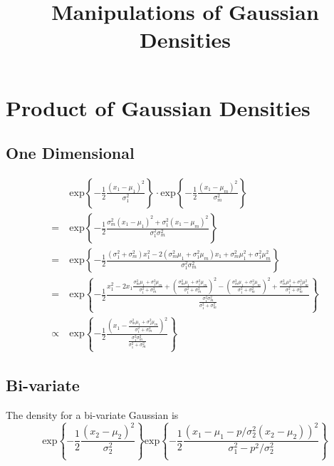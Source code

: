 \documentclass[10pt]{article}
\title{\vspace{-4ex}\textbf{Manipulations of Gaussian Densities\vspace{-4ex}}}
\date{}
\newcommand{\expb}[1]{\ensuremath{\mathrm{exp}\left\{#1\right\}}}
\begin{document}
\maketitle

\section{Product of Gaussian Densities}

\subsection{One Dimensional}

\begin{align*}
	&\expb{-\frac{1}{2}\frac{(x_1-\mu_1)^2}{\sigma_1^2}} \cdot \expb{-\frac{1}{2}\frac{(x_1-\mu_m)^2}{\sigma_m^2}} \\
	= \ &\expb{-\frac{1}{2} \frac{\sigma_m^2(x_1-\mu_1)^2 + \sigma_1^2(x_1-\mu_m)^2}{\sigma_1^2\sigma_m^2}} \\
	= \ &\expb{-\frac{1}{2} \frac{(\sigma_1^2+\sigma_m^2)x_1^2 - 2(\sigma_m^2\mu_1 + \sigma_1^2\mu_m)x_1 + \sigma_m^2\mu_1^2 + \sigma_1^2\mu_m^2}{\sigma_1^2\sigma_m^2}} \\
	= \ &\expb{-\frac{1}{2} \frac{x_1^2 - 2x_1\frac{\sigma_m^2\mu_1 + \sigma_1^2\mu_m}{\sigma_1^2+\sigma_m^2} + \left(\frac{\sigma_m^2\mu_1 + \sigma_1^2\mu_m}{\sigma_1^2+\sigma_m^2}\right)^2 - \left(\frac{\sigma_m^2\mu_1 + \sigma_1^2\mu_m}{\sigma_1^2+\sigma_m^2}\right)^2 + \frac{\sigma_m^2\mu_1^2+\sigma_1^2\mu_m^2}{\sigma_1^2+\sigma_m^2} }{\frac{\sigma_1^2\sigma_m^2}{\sigma_1^2+\sigma_m^2}}} \\
	\propto \ &\expb{-\frac{1}{2} \frac{\left( x_1 - \frac{\sigma_m^2\mu_1 + \sigma_1^2\mu_m}{\sigma_1^2+\sigma_m^2} \right)^2}{\frac{\sigma_1^2\sigma_m^2}{\sigma_1^2+\sigma_m^2}}}
\end{align*}

\subsection{Bi-variate}
The density for a bi-variate Gaussian is
\begin{equation*}
	\expb{-\frac{1}{2} \frac{(x_2-\mu_2)^2}{\sigma_2^2}} \expb{-\frac{1}{2} \frac{(x_1-\mu_1-p/\sigma_2^2(x_2-\mu_2))^2}{\sigma_1^2-p^2/\sigma_2^2}}
\end{equation*}
\end{document}
